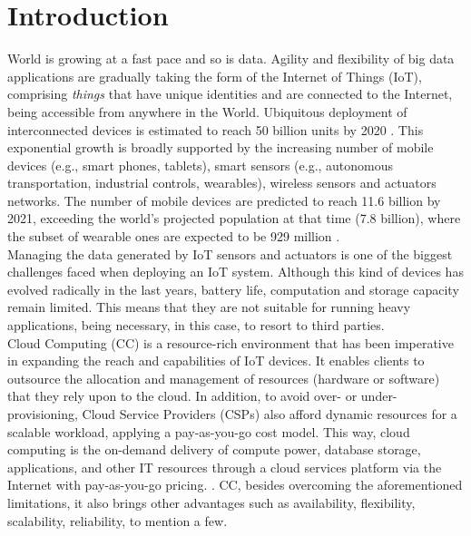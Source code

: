 \section{Introduction}\label{sec:Introduction}
World is growing at a fast pace and so is data. Agility and flexibility of big data applications are gradually taking the form of the Internet of Things (IoT), comprising \textit{things} that have unique identities and are connected to the Internet, being accessible from anywhere in the World. Ubiquitous deployment of interconnected devices is estimated to reach 50 billion units by 2020 \cite{evans2011internet}. This exponential growth is broadly supported by the increasing number of mobile devices (e.g., smart phones, tablets), smart sensors (e.g., autonomous transportation, industrial controls, wearables), wireless sensors and actuators networks. The number of mobile devices are predicted to reach 11.6 billion by 2021, exceeding the world’s projected population at that time (7.8 billion), where the subset of wearable ones are expected to be 929 million \cite{CiscoVis16:online}.\\ [6pt]
Managing the data generated by IoT sensors and actuators is one of the biggest challenges faced when deploying an IoT system. Although this kind of devices has evolved radically in the last years, battery life, computation and storage capacity remain limited. This means that they are not suitable for running heavy applications, being necessary, in this case, to resort to third parties.\\ [6pt]
Cloud Computing (CC) is a resource-rich environment that has been imperative in expanding the reach and capabilities of IoT devices. It enables clients to outsource the allocation and management of resources (hardware or software) that they rely upon to the cloud. In addition, to avoid over- or under-provisioning, Cloud Service Providers (CSPs) also afford dynamic resources for a scalable workload, applying a pay-as-you-go cost model. This way, cloud computing is the on-demand delivery of compute power, database storage, applications, and other IT resources through a cloud services platform via the Internet with pay-as-you-go pricing. \cite{WhatisCl79:online}. CC, besides overcoming the aforementioned limitations, it also brings other advantages such as availability, flexibility, scalability, reliability, to mention a few.\\ [6pt]
